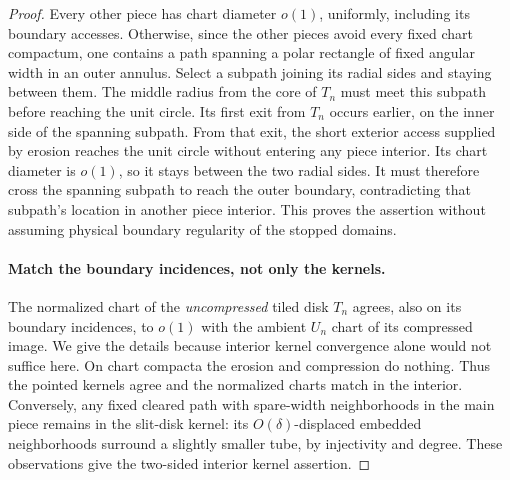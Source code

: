 \begin{proof}
Every other piece has chart diameter $o(1)$, uniformly, including
its boundary accesses.  Otherwise, since the other pieces avoid
every fixed chart compactum, one contains a path spanning a polar
rectangle of fixed angular width in an outer annulus.  Select a
subpath joining its radial sides and staying between them.  The
middle radius from the core of $T_n$ must meet this subpath before
reaching the unit circle.  Its first exit from $T_n$ occurs earlier,
on the inner side of the spanning subpath.  From that exit, the
short exterior access supplied by erosion reaches the unit circle
without entering any piece interior.  Its chart diameter is $o(1)$,
so it stays between the two radial sides.  It must therefore cross
the spanning subpath to reach the outer boundary, contradicting
that subpath's location in another piece interior.
This proves the assertion without assuming physical boundary
regularity of the stopped domains.

\paragraph{Match the boundary incidences, not only the kernels.}
The normalized chart of the \emph{uncompressed} tiled disk $T_n$
agrees, also on its boundary incidences, to $o(1)$ with the ambient
$U_n$ chart of its compressed image.  We give the details because
interior kernel convergence alone would not suffice here.
On chart compacta the erosion and compression do nothing.  Thus
the pointed kernels agree and the normalized charts match in the
interior.  Conversely, any fixed cleared path with spare-width
neighborhoods in the main piece remains in the slit-disk kernel:
its $O(\delta)$-displaced embedded neighborhoods surround a
slightly smaller tube, by injectivity and degree.  These observations
give the two-sided interior kernel assertion.


\end{proof}
